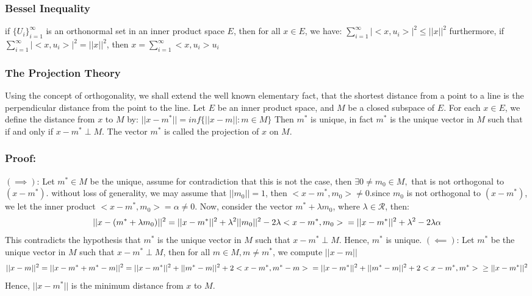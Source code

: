 \documentclass[12pt]{article}
\begin{document}
\subsubsection*{Bessel Inequality}
if $\{U_i\}_{i=1}^{\infty}$ is an orthonormal set in an inner product space $E$, then for all $x \in E$, we have:
\begin{math}
    \sum_{i=1}^{\infty} |<x,u_i>|^2 \le ||x||^2
\end{math}
furthermore, if $\sum_{i=1}^{\infty} |<x,u_i>|^2 = ||x||^2$, then $x = \sum_{i=1}^{\infty} <x,u_i>u_i$

\subsubsection*{The Projection Theory}
Using the concept of orthogonality, we shall extend the well known elementary fact, that the shortest distance from a point to a line is the perpendicular distance from the point to the line. Let $E$ be an inner product space, and $M$ be a closed subspace of $E$. For each $x \in E$, we define the distance from $x$ to $M$ by:
\begin{math}
    ||x-m^*|| = inf\{||x-m||: m \in M\}
\end{math}
Then $m^*$ is unique, in fact $m^*$ is the unique vector in $M$ such that if and only if $x-m^* \perp M$. The vector $m^*$ is called the projection of $x$ on $M$.
\subsubsection*{Proof:}
$(\implies)$: Let $m^* \in M$ be the unique, assume for contradiction that this is not the case, then $\exists 0 \ne m_{0} \in M,$ that is not orthogonal to $(x-m^*)$.
without loss of generality, we may assume that $||m_0|| = 1$, then $<x-m^*,m_0> \ne 0$.since $m_0$ is not orthogonal to $(x-m^*)$, we let the inner product $<x-m^*,m_0> = \alpha \ne 0$. Now, consider the vector $m^* + \lambda m_0$, where $\lambda \in \mathcal{R}$, then:
\begin{equation*}
    ||x-(m^* + \lambda m_0)||^2 = ||x-m^*||^2 + \lambda^2||m_0||^2 - 2\lambda<x-m^*,m_0> \\
    = ||x-m^*||^2 + \lambda^2 - 2\lambda \alpha \\
\end{equation*}
This contradicts the hypothesis that $m^*$ is the unique vector in $M$ such that $x-m^* \perp M$. Hence, $m^*$ is unique.
\newline
$(\impliedby)$: Let $m^*$ be the unique vector in $M$ such that $x-m^* \perp M$, then for all $m \in M, m \ne m^*$, we compute $||x-m||$
\begin{equation*}
    ||x-m||^2 = ||x-m^* + m^* - m||^2 \\
    = ||x-m^*||^2 + ||m^* - m||^2 + 2<x-m^*,m^*-m> \\
    = ||x-m^*||^2 + ||m^* - m||^2 + 2<x-m^*,m^*> \\
    \ge ||x-m^*||^2
\end{equation*}
Hence, $||x-m^*||$ is the minimum distance from $x$ to $M$.
\end{document}
